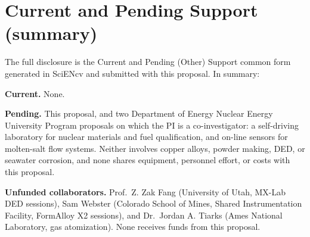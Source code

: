 \documentclass[12pt,letterpaper]{article}
\begin{document}
\clearpage
\setcounter{page}{1}
\renewcommand{\thepage}{S-\arabic{page}}
\section*{Current and Pending Support (summary)}

The full disclosure is the Current and Pending (Other) Support common form
generated in SciENcv and submitted with this proposal. In summary:

\textbf{Current.} None.

\textbf{Pending.} This proposal, and two Department of Energy Nuclear Energy
University Program proposals on which the PI is a co-investigator: a
self-driving laboratory for nuclear materials and fuel qualification, and
on-line sensors for molten-salt flow systems. Neither involves copper alloys,
powder making, DED, or seawater corrosion, and none shares equipment,
personnel effort, or costs with this proposal.

\textbf{Unfunded collaborators.} Prof.~Z. Zak Fang (University of Utah,
MX-Lab DED sessions), Sam Webster (Colorado School of Mines, Shared
Instrumentation Facility, FormAlloy X2 sessions), and Dr.~Jordan A. Tiarks
(Ames National Laboratory, gas atomization).
None receives funds from this proposal.
\end{document}
